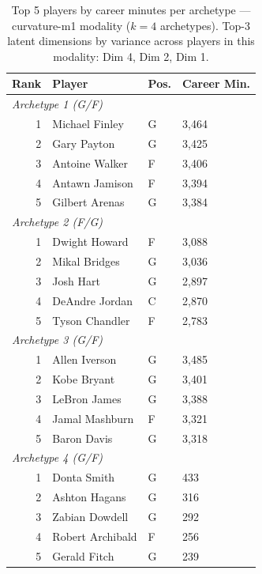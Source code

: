 \begin{table}[htbp]
  \centering\small
  \begin{tabular}{rlll}
    \toprule
    Rank & Player & Pos. & Career Min. \\
    \midrule
    \multicolumn{4}{l}{\textit{Archetype 1 (G/F)}} \\
    \midrule
    1 & Michael Finley & G & 3,464 \\
    2 & Gary Payton & G & 3,425 \\
    3 & Antoine Walker & F & 3,406 \\
    4 & Antawn Jamison & F & 3,394 \\
    5 & Gilbert Arenas & G & 3,384 \\
    \midrule[0.4pt]
    \multicolumn{4}{l}{\textit{Archetype 2 (F/G)}} \\
    \midrule
    1 & Dwight Howard & F & 3,088 \\
    2 & Mikal Bridges & G & 3,036 \\
    3 & Josh Hart & G & 2,897 \\
    4 & DeAndre Jordan & C & 2,870 \\
    5 & Tyson Chandler & F & 2,783 \\
    \midrule[0.4pt]
    \multicolumn{4}{l}{\textit{Archetype 3 (G/F)}} \\
    \midrule
    1 & Allen Iverson & G & 3,485 \\
    2 & Kobe Bryant & G & 3,401 \\
    3 & LeBron James & G & 3,388 \\
    4 & Jamal Mashburn & F & 3,321 \\
    5 & Baron Davis & G & 3,318 \\
    \midrule[0.4pt]
    \multicolumn{4}{l}{\textit{Archetype 4 (G/F)}} \\
    \midrule
    1 & Donta Smith & G & 433 \\
    2 & Ashton Hagans & G & 316 \\
    3 & Zabian Dowdell & G & 292 \\
    4 & Robert Archibald & F & 256 \\
    5 & Gerald Fitch & G & 239 \\
    \bottomrule
  \end{tabular}
  \caption{Top 5 players by career minutes per archetype --- curvature-m1 modality ($k=4$ archetypes). Top-3 latent dimensions by variance across players in this modality: Dim 4, Dim 2, Dim 1.}
  \label{tab:arch_reps_curvature_m1}
\end{table}

